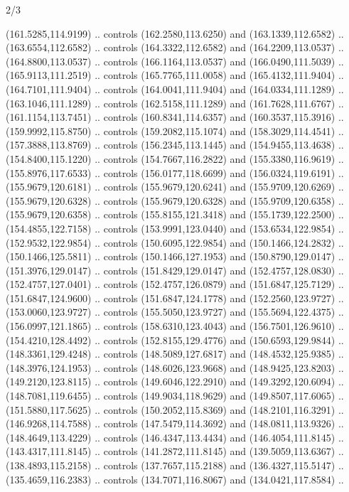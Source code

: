 \begin{flagdescription}{2/3}
\begin{scope}[xshift=0.5\flaglength,yshift=0.5\flagwidth,scale=\flagwidth/180]
\begin{scope}[y=0.8pt, x=0.8pt, yscale=-1,shift={(-168.75,-108.75)}]
  (161.5285,114.9199) .. controls (162.2580,113.6250) and (163.1339,112.6582) ..
  (163.6554,112.6582) .. controls (164.3322,112.6582) and (164.2209,113.0537) ..
  (164.8800,113.0537) .. controls (166.1164,113.0537) and (166.0490,111.5039) ..
  (165.9113,111.2519) .. controls (165.7765,111.0058) and (165.4132,111.9404) ..
  (164.7101,111.9404) .. controls (164.0041,111.9404) and (164.0334,111.1289) ..
  (163.1046,111.1289) .. controls (162.5158,111.1289) and (161.7628,111.6767) ..
  (161.1154,113.7451) .. controls (160.8341,114.6357) and (160.3537,115.3916) ..
  (159.9992,115.8750) .. controls (159.2082,115.1074) and (158.3029,114.4541) ..
  (157.3888,113.8769) .. controls (156.2345,113.1445) and (154.9455,113.4638) ..
  (154.8400,115.1220) .. controls (154.7667,116.2822) and (155.3380,116.9619) ..
  (155.8976,117.6533) .. controls (156.0177,118.6699) and (156.0324,119.6191) ..
  (155.9679,120.6181) .. controls (155.9679,120.6241) and (155.9709,120.6269) ..
  (155.9679,120.6328) .. controls (155.9679,120.6328) and (155.9709,120.6358) ..
  (155.9679,120.6358) .. controls (155.8155,121.3418) and (155.1739,122.2500) ..
  (154.4855,122.7158) .. controls (153.9991,123.0440) and (153.6534,122.9854) ..
  (152.9532,122.9854) .. controls (150.6095,122.9854) and (150.1466,124.2832) ..
  (150.1466,125.5811) .. controls (150.1466,127.1953) and (150.8790,129.0147) ..
  (151.3976,129.0147) .. controls (151.8429,129.0147) and (152.4757,128.0830) ..
  (152.4757,127.0401) .. controls (152.4757,126.0879) and (151.6847,125.7129) ..
  (151.6847,124.9600) .. controls (151.6847,124.1778) and (152.2560,123.9727) ..
  (153.0060,123.9727) .. controls (155.5050,123.9727) and (155.5694,122.4375) ..
  (156.0997,121.1865) .. controls (158.6310,123.4043) and (156.7501,126.9610) ..
  (154.4210,128.4492) .. controls (152.8155,129.4776) and (150.6593,129.9844) ..
  (148.3361,129.4248) .. controls (148.5089,127.6817) and (148.4532,125.9385) ..
  (148.3976,124.1953) .. controls (148.6026,123.9668) and (148.9425,123.8203) ..
  (149.2120,123.8115) .. controls (149.6046,122.2910) and (149.3292,120.6094) ..
  (148.7081,119.6455) .. controls (149.9034,118.9629) and (149.8507,117.6065) ..
  (151.5880,117.5625) .. controls (150.2052,115.8369) and (148.2101,116.3291) ..
  (146.9268,114.7588) .. controls (147.5479,114.3692) and (148.0811,113.9326) ..
  (148.4649,113.4229) .. controls (146.4347,113.4434) and (146.4054,111.8145) ..
  (143.4317,111.8145) .. controls (141.2872,111.8145) and (139.5059,113.6367) ..
  (138.4893,115.2158) .. controls (137.7657,115.2188) and (136.4327,115.5147) ..
  (135.4659,116.2383) .. controls (134.7071,116.8067) and (134.0421,117.8584) ..

\end{scope}
\end{scope}
\end{flagdescription}
